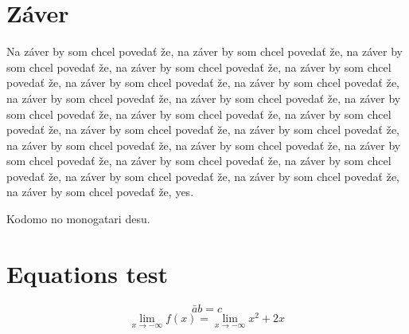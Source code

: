 \documentclass[10pt,slovak,a4paper]{IEEEtran}
\begin{document}
\section{Záver} \label{zaver} %
Na záver by som chcel povedať že, na záver by som chcel povedať že, na záver by som chcel povedať že, na záver by som chcel povedať že, na záver by som chcel povedať že, na záver by som chcel povedať že, na záver by som chcel povedať že, na záver by som chcel povedať že, na záver by som chcel povedať že, na záver by som chcel povedať že, na záver by som chcel povedať že, na záver by som chcel povedať že, na záver by som chcel povedať že, na záver by som chcel povedať že, na záver by som chcel povedať že, na záver by som chcel povedať že, na záver by som chcel povedať že, na záver by som chcel povedať že, na záver by som chcel povedať že, na záver by som chcel povedať že, na záver by som chcel povedať že, na záver by som chcel povedať že, yes.

Kodomo no monogatari desu.

\section{Equations test} \label{equations_test}
$$ \bar{a} b = c $$
$$ \lim_{x\to-\infty} f(x) = \lim_{x\to-\infty} x^2 + 2x $$




\end{document}
